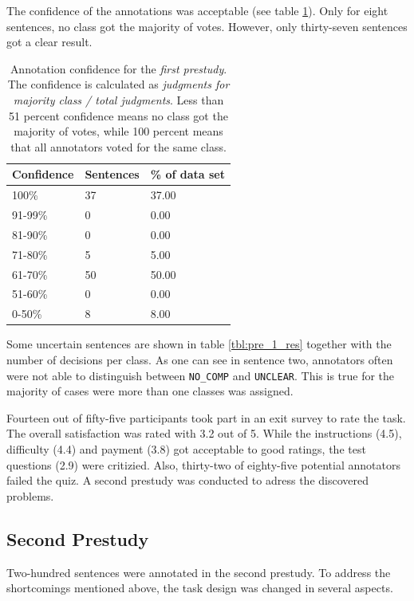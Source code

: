 The confidence of the annotations was acceptable (see table \ref{fig:pre_a_agg}). Only for eight sentences, no class got the majority of votes. However, only thirty-seven sentences got a clear result.

\begin{table}[htbp]
\caption{Annotation confidence for the \emph{first prestudy}. The confidence is calculated as \emph{judgments for majority class / total judgments}. Less than 51 percent confidence means no class got the majority of votes, while 100 percent means that all annotators voted for the same class.}
\label{fig:pre_a_agg}
\begin{tabularx}{\textwidth}{XXX}
\toprule
Confidence & Sentences & \% of data set \\
\midrule
100\%	&	37	&	37.00	 \\ 
91-99\%	&	0	&	0.00	 \\ 
81-90\%	&	0	&	0.00	 \\ 
71-80\%	&	5	&	5.00	 \\ 
61-70\%	&	50	&	50.00	 \\ 
51-60\%	&	0	&	0.00	 \\ 
0-50\%	&	8	&	8.00	 \\ 
\bottomrule
\end{tabularx}
\end{table}




Some uncertain sentences are shown in table \ref{tbl:pre_1_res} together with the number of decisions per class. As one can see in sentence two, annotators often were not able to distinguish between \texttt{NO\_COMP} and \texttt{UNCLEAR}. This is true for the majority of cases were more than one classes was assigned.



Fourteen out of fifty-five participants took part in an exit survey to rate the task. The overall satisfaction was rated with 3.2 out of 5. While the instructions (4.5), difficulty (4.4) and payment (3.8) got acceptable to good ratings, the test questions (2.9) were critizied. Also, thirty-two of eighty-five potential annotators failed the quiz. A second prestudy was conducted to adress the discovered problems.


\FloatBarrier
\subsection{Second Prestudy}
Two-hundred sentences were annotated in the second prestudy. To address the shortcomings mentioned above, the task design was changed in several aspects.

